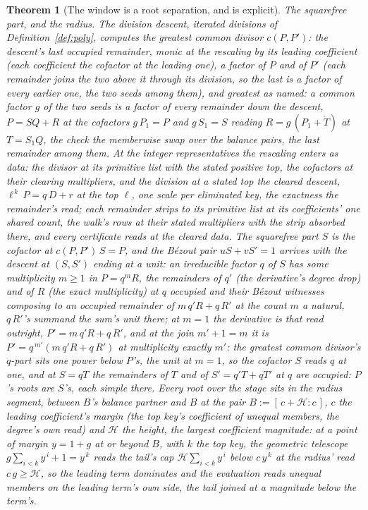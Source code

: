 \documentclass[11pt]{article}
\newtheorem{theorem}{Theorem}
\theoremstyle{definition}
\begin{document}
\begin{theorem}[The window is a root separation, and is explicit]
\emph{The squarefree part, and the radius.} The \emph{division
descent}, iterated divisions of Definition~\ref{def:poly},
computes the \emph{greatest common divisor} $c(P,P')$: the
descent's last occupied remainder, monic at the rescaling by its
leading coefficient (each coefficient the cofactor at the leading
one), a factor of $P$ and of $P'$ (each remainder joins the two
above it through its division, so the last is a factor of
every earlier one, the two seeds among them), and greatest as
named: a common factor $g$ of the two seeds is a factor of every
remainder down the descent, $P=SQ+R$ at the cofactors $g\,P_1=P$
and $g\,S_1=S$ reading $R=g\,(P_1+\check T)$ at $T=S_1Q$, the
check the memberwise swap over the balance pairs, the last
remainder among them.  At the integer representatives the
rescaling enters as data: the divisor at its primitive list with
the stated positive top, the cofactors at their clearing
multipliers, and the division at a stated top the cleared
descent, $\ell^{\,k}\,P=q\,D+r$ at the top $\ell$, one scale per
eliminated key, the exactness the remainder's read; each
remainder strips to its primitive list at its coefficients' one
shared count, the walk's rows at their stated multipliers with
the strip absorbed there, and every certificate reads at the
cleared data.  The squarefree part
$S$ is the cofactor at
$c(P,P')\,S=P$, and the B\'ezout pair $uS+vS'=1$ arrives with the descent
at $(S,S')$ ending at a unit: an irreducible factor $q$ of $S$ has
some multiplicity $m\ge1$ in $P=q^{m}R$, the remainders of $q'$
(the derivative's degree drop) and of $R$ (the exact
multiplicity) at $q$ occupied and their B\'ezout witnesses
composing to an occupied remainder of $m\,q'R+q\,R'$ at the count
$m$ a natural, $q\,R'$'s summand the sum's unit there; at $m=1$
the derivative is that read outright, $P'=m\,q'R+q\,R'$, and at
the join $m'+1=m$ it is $P'=q^{\,m'}(m\,q'R+q\,R')$ at
multiplicity exactly $m'$: the greatest common divisor's $q$-part sits one power
below $P$'s, the unit at $m=1$, so the cofactor $S$ reads $q$ at
one, and at $S=qT$ the remainders of $T$ and of
$S'=q'T+qT'$ at $q$ are occupied: $P$'s roots are $S$'s, each
simple there. Every root over the stage sits in the \emph{radius segment},
between $B$'s balance partner and $B$ at the pair
$B:=[\,c+\mathcal H:c\,]$, $c$ the leading coefficient's margin
(the top key's coefficient of unequal members, the degree's own
read)
and $\mathcal H$ the height, the largest coefficient magnitude: at a
point of margin $y=1+g$ at or beyond $B$, with $k$ the top key,
the geometric telescope $g\sum_{i<k}y^{\,i}+1=y^{\,k}$ reads the
tail's cap $\mathcal H\sum_{i<k}y^{\,i}$ below $c\,y^{\,k}$ at the
radius' read $c\,g\ge\mathcal H$, so the leading term dominates
and the evaluation reads unequal members on the leading term's own
side, the tail joined at a magnitude below the term's.


\end{theorem}
\end{document}
